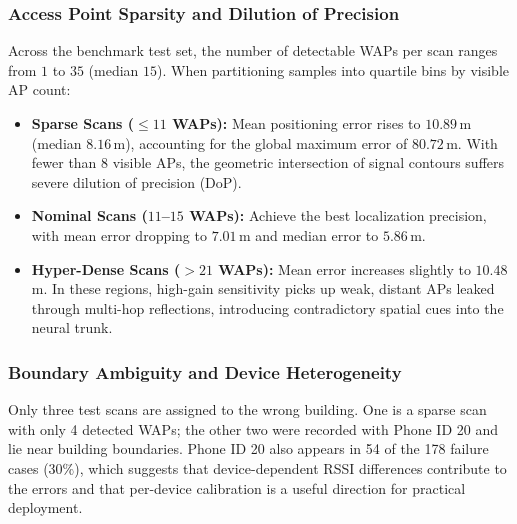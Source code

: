 \subsubsection{Access Point Sparsity and Dilution of Precision}
Across the benchmark test set, the number of detectable WAPs per scan ranges from $1$ to $35$ (median $15$). When partitioning samples into quartile bins by visible AP count:
\begin{itemize}
    \item \textbf{Sparse Scans ($\le 11$ WAPs):} Mean positioning error rises to $10.89$\,m (median $8.16$\,m), accounting for the global maximum error of $80.72$\,m. With fewer than 8 visible APs, the geometric intersection of signal contours suffers severe dilution of precision (DoP).
    \item \textbf{Nominal Scans ($11$--$15$ WAPs):} Achieve the best localization precision, with mean error dropping to $7.01$\,m and median error to $5.86$\,m.
    \item \textbf{Hyper-Dense Scans ($> 21$ WAPs):} Mean error increases slightly to $10.48$\,m. In these regions, high-gain sensitivity picks up weak, distant APs leaked through multi-hop reflections, introducing contradictory spatial cues into the neural trunk.
\end{itemize}

\subsubsection{Boundary Ambiguity and Device Heterogeneity}
Only three test scans are assigned to the wrong building. One is a sparse scan with only 4 detected WAPs; the other two were recorded with Phone ID 20 and lie near building boundaries. Phone ID 20 also appears in 54 of the 178 failure cases ($30\%$), which suggests that device-dependent RSSI differences contribute to the errors and that per-device calibration is a useful direction for practical deployment.
